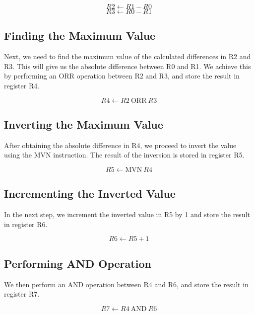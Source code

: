 \begin{thebibliography}{9}
\begin{equation}
R2 \leftarrow R1 - R0
\end{equation}
\begin{equation}
R3 \leftarrow R0 - R1
\end{equation}

\subsection{Finding the Maximum Value}
Next, we need to find the maximum value of the calculated differences in R2 and R3. This will give us the absolute difference between R0 and R1. We achieve this by performing an ORR operation between R2 and R3, and store the result in register R4.

\begin{equation}
R4 \leftarrow R2 \: \text{ORR} \: R3
\end{equation}

\subsection{Inverting the Maximum Value}
After obtaining the absolute difference in R4, we proceed to invert the value using the MVN instruction. The result of the inversion is stored in register R5.

\begin{equation}
R5 \leftarrow \text{MVN} \: R4
\end{equation}

\subsection{Incrementing the Inverted Value}
In the next step, we increment the inverted value in R5 by 1 and store the result in register R6.

\begin{equation}
R6 \leftarrow R5 + 1
\end{equation}

\subsection{Performing AND Operation}
We then perform an AND operation between R4 and R6, and store the result in register R7.

\begin{equation}
R7 \leftarrow R4 \: \text{AND} \: R6
\end{equation}


\end{thebibliography}
